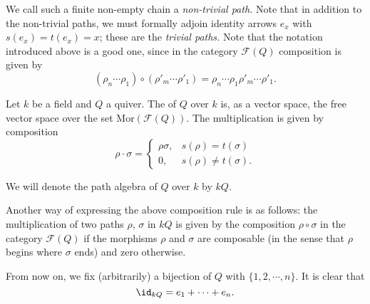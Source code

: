\documentclass[main.tex]{subfiles}
\begin{document}
We call such a finite non-empty chain a \emph{non-trivial path.} Note that in addition to the non-trivial paths, we must formally adjoin identity arrows $e_{x}$ with $s(e_{x}) = t(e_{x}) = x$; these are the \emph{trivial paths.} Note that the notation introduced above is a good one, since in the category $\mathcal{F}(Q)$ composition is given by
\begin{equation*}
  (\rho_{n}\cdots \rho_{1}) \circ (\rho'_{m}\cdots \rho'_{1}) = \rho_{n}\cdots \rho_{1} \rho'_{m}\cdots \rho'_{1}.
\end{equation*}

\begin{definition}
  \label{def:path_algebra}
  Let $k$ be a field and $Q$ a quiver. The  of $Q$ over $k$ is, as a vector space, the free vector space over the set $\mathrm{Mor}(\mathcal{F}(Q))$. The multiplication is given by composition
  \begin{equation*}
    \rho\cdot \sigma =
    \begin{cases}
      \rho\sigma, & s(\rho) = t(\sigma) \\
      0, & s(\rho) \neq t(\sigma).
    \end{cases}
  \end{equation*}

  We will denote the path algebra of $Q$ over $k$ by $kQ$.

\end{definition}

Another way of expressing the above composition rule is as follows: the multiplication of two paths $\rho$, $\sigma$ in $kQ$ is given by the composition $\rho \circ \sigma$ in the category $\mathcal{F}(Q)$ if the morphisms $\rho$ and $\sigma$ are composable (in the sense that $\rho$ begins where $\sigma$ ends) and zero otherwise.

From now on, we fix (arbitrarily) a bijection of $Q$ with $\{1,2,\cdots,n\}$. It is clear that
\begin{equation*}
  \id_{kQ} = e_{1} + \cdots + e_{n}.
\end{equation*}
\end{document}
